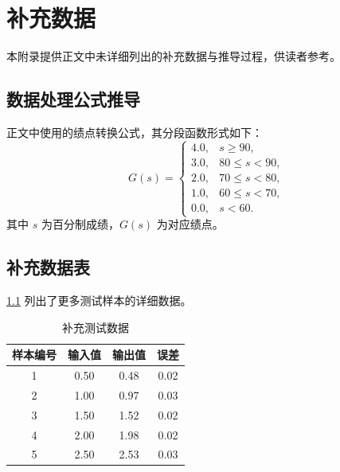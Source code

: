\chapter{补充数据}\label{sec:appendix-data}

本附录提供正文中未详细列出的补充数据与推导过程，供读者参考。

\section{数据处理公式推导}

正文中使用的绩点转换公式，其分段函数形式如下：
\begin{equation}\label{eq:gpa-conversion}
  G(s) =
  \begin{cases}
    4.0, & s \geq 90, \\
    3.0, & 80 \leq s < 90, \\
    2.0, & 70 \leq s < 80, \\
    1.0, & 60 \leq s < 70, \\
    0.0, & s < 60.
  \end{cases}
\end{equation}
其中 $s$ 为百分制成绩，$G(s)$ 为对应绩点。

\section{补充数据表}

\cref{tab:appendix-sample} 列出了更多测试样本的详细数据。

\begin{table}[!htb]
  \caption{补充测试数据}
  \label{tab:appendix-sample}
  \centering
  \begin{tabular}{@{}cccc@{}} \toprule
    \textbf{样本编号} & \textbf{输入值} & \textbf{输出值} & \textbf{误差} \\ \midrule
    1 & 0.50 & 0.48 & 0.02 \\
    2 & 1.00 & 0.97 & 0.03 \\
    3 & 1.50 & 1.52 & 0.02 \\
    4 & 2.00 & 1.98 & 0.02 \\
    5 & 2.50 & 2.53 & 0.03 \\ \bottomrule
  \end{tabular}
\end{table}
